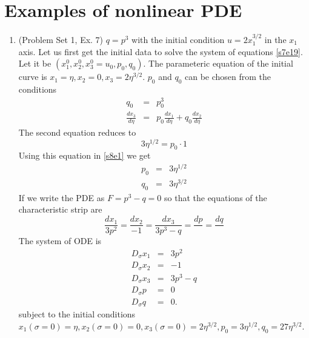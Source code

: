 \documentclass{article}
\newcommand{\td}[2]{\frac{d{#1}}{d{#2}}}
\theoremstyle{plain}
\numberwithin{thm}{section}
\theoremstyle{plain}
\numberwithin{prop}{section}
\theoremstyle{definition}
\numberwithin{defn}{section}
\theoremstyle{remark}
\numberwithin{equation}{section}
\begin{document}
\section{Examples of nonlinear PDE}\label{s8}
\begin{enumerate}
\item (Problem Set 1, Ex. 7) $q = p^3$ with the initial condition $u = 2x_1^{3/2}$ in the $x_1$ axis. 
Let us first get the initial data to solve the system of equations \eqref{s7e19}. Let it be $(x_1^0,
x_2^0, x_3^0 = u_0, p_0, q_0)$. The parameteric equation of the initial curve is $x_1 = \eta, x_2 = 0,
x_3 = 2\eta^{3/2}$. $p_0$ and $q_0$ can be chosen from the conditions
\begin{eqnarray}
q_0 &=& p_0^{3} \label{s8e1} \\
\td{x_3}{\eta} &=& p_0\td{x_1}{\eta} + q_0\td{x_2}{\eta} \label{s8e2}
\end{eqnarray}
The second equation reduces to
\[
3\eta^{1/2} = p_0 \cdot 1
\]
Using this equation in \eqref{s8e1} we get
\begin{eqnarray}
p_0 &=& 3\eta^{1/2} \label{s8e3} \\
q_0 &=& 3\eta^{3/2} \label{s8e4}
\end{eqnarray}
If we write the PDE as $F = p^3 - q = 0$ so that the equations of the characteristic strip are
\[
\frac{dx_1}{3p^2} = \frac{dx_2}{-1} = \frac{dx_3}{3p^3 - q} = \frac{dp}{} = \frac{dq}{}
\]
The system of ODE is
\begin{eqnarray}
D_\sigma x_1 &=& 3p^2 \label{s8e5} \\
D_\sigma x_2 &=& -1 \label{s8e6} \\
D_\sigma x_3 &=& 3p^3 - q \label{s8e7} \\
D_\sigma p &=& 0 \label{s8e8} \\
D_\sigma q &=& 0. \label{s8e9}
\end{eqnarray}
subject to the initial conditions $x_1(\sigma = 0) = \eta, x_2(\sigma = 0) = 0, x_3(\sigma = 0) =
 2\eta^{3/2}, p_0 = 3\eta^{1/2}, q_0 = 27\eta^{3/2}$.
 

\end{enumerate}
\end{document}
